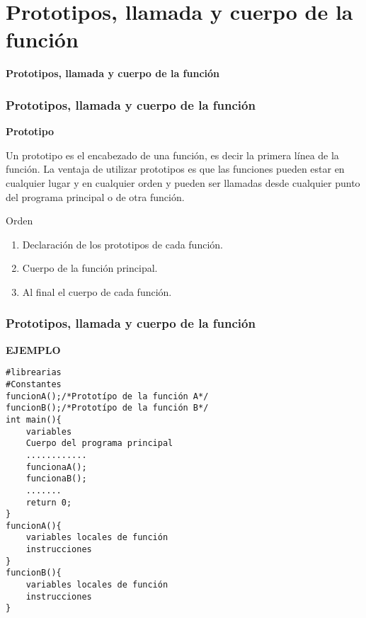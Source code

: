 \section*{Prototipos, llamada y cuerpo de la función}

\begin{frame}[c] 
\centering
\huge \textbf{Prototipos, llamada y cuerpo de la función}
\end{frame}



\begin{frame}[t]
    \frametitle{Prototipos, llamada y cuerpo de la función}
    \begin{center}
        \textbf{Prototipo}
    \end{center}
    \vspace{-6mm}
    \hspace{5mm}Un prototipo es el encabezado de una función, es decir la primera línea de la función. La ventaja de utilizar prototipos es que las funciones pueden estar en cualquier lugar y en cualquier orden y pueden ser llamadas desde cualquier punto del programa principal o de otra función.
    \vspace{-2mm}
    \begin{block}{Orden}
        \begin{enumerate}
            \item Declaración de los prototipos de cada función.\pause
            \item Cuerpo de la función principal.\pause
            \item Al final el cuerpo de cada función.
        \end{enumerate}
    \end{block}
\end{frame}



\begin{frame}[fragile]
    \frametitle{Prototipos, llamada y cuerpo de la función}
    \begin{center}
        \textbf{EJEMPLO}
    \end{center}
    \begin{lstlisting}[basicstyle=\ttfamily\tiny]
#librearias
#Constantes
funcionA();/*Prototípo de la función A*/
funcionB();/*Prototípo de la función B*/
int main(){
    variables
    Cuerpo del programa principal
    ............
    funcionaA();
    funcionaB();
    .......
    return 0;
}
funcionA(){
    variables locales de función
    instrucciones
}
funcionB(){
    variables locales de función
    instrucciones
}
\end{lstlisting}
\end{frame}
